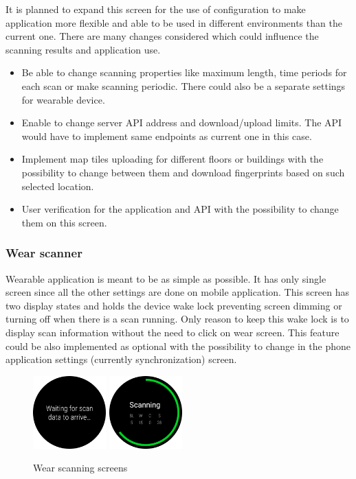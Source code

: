 It is planned to expand this screen for the use of configuration to make application more flexible and able to be used in different environments than the current one. There are many changes considered which could influence the scanning results and application use.

\begin{itemize}
	\item Be able to change scanning properties like maximum length, time periods for each scan or make scanning periodic. There could also be a separate settings for wearable device.
	\item Enable to change server API address and download/upload limits. The API would have to implement same endpoints as current one in this case.
	\item Implement map tiles uploading for different floors or buildings with the possibility to change between them and download fingerprints based on such selected location.
	\item User verification for the application and API with the possibility to change them on this screen.
\end{itemize}

\subsubsection{Wear scanner}\label{subsec:WearableScanner}
Wearable application is meant to be as simple as possible. It has only single screen since all the other settings are done on mobile application. This screen has two display states and holds the device wake lock preventing screen dimming or turning off when there is a scan running. Only reason to keep this wake lock is to display scan information without the need to click on wear screen. This feature could be also implemented as optional with the possibility to change in the phone application settings (currently synchronization) screen. 

\begin{figure}[H]
	\begin{centering}
		\includegraphics[width=0.25\textwidth]{img/wear_waiting_edited}
		\hspace{0.5cm}
		\includegraphics[width=0.25\textwidth]{img/wear_scanning_edited}
		\par\end{centering}
	\caption{Wear scanning screens}
	\label{fig09c05}
\end{figure}


